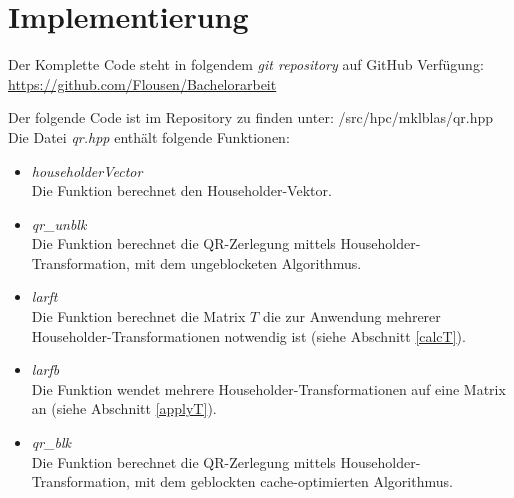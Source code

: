 \section{Implementierung}
Der Komplette Code steht in folgendem \textit{git repository} auf GitHub Verfügung: \\
\url{https://github.com/Flousen/Bachelorarbeit} 

Der folgende Code ist im Repository zu finden unter: /src/hpc/mklblas/qr.hpp\\
Die Datei \textit{qr.hpp} enthält folgende Funktionen:
\begin{itemize}
    \item \textit{householderVector}\\
    Die Funktion berechnet den Householder-Vektor.
	\item \textit{qr\_unblk} \\
	Die Funktion berechnet die QR-Zerlegung mittels Householder-Transformation, mit dem ungeblocketen Algorithmus.
	\item \textit{larft}\\
	Die Funktion berechnet die Matrix $T$ die zur Anwendung mehrerer Householder-Transformationen notwendig ist (siehe Abschnitt \ref{calcT}).
	\item \textit{larfb}\\
	Die Funktion wendet mehrere Householder-Transformationen auf eine Matrix an (siehe Abschnitt \ref{applyT}). 
	\item \textit{qr\_blk}\\
	Die Funktion berechnet die QR-Zerlegung mittels Householder-Transformation, mit dem geblockten cache-optimierten Algorithmus.
\end{itemize}

\vspace{.7cm}
\lstset{numbers=left,firstnumber=1}




